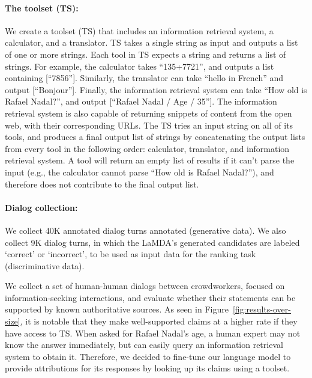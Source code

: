 \paragraph{The toolset (TS):}We create a toolset (TS) that includes an information retrieval system, a calculator, and a translator. TS takes a single string as input and outputs a list of one or more strings. Each tool in TS expects a string and returns a list of strings. For example, the calculator takes ``135+7721'', and outputs a list containing [``7856''].  Similarly, the translator can take ``hello in French'' and output [``Bonjour'']. Finally, the information retrieval system can take ``How old is Rafael Nadal?'', and output [``Rafael Nadal / Age / 35'']. The information retrieval system is also capable of returning snippets of content from the open web, with their corresponding URLs. The TS tries an input string on all of its tools, and produces a final output list of strings by concatenating the output lists from every tool in the following order: calculator, translator, and information retrieval system. A tool will return an empty list of results if it can't parse the input (e.g., the calculator cannot parse ``How old is Rafael Nadal?''), and therefore does not contribute to the final output list.

\paragraph{Dialog collection:}We collect 40K annotated dialog turns annotated (generative data). We also collect 9K dialog turns, in which the LaMDA’s generated candidates are labeled ‘correct’ or ‘incorrect’, to be used as input data for the ranking task (discriminative data).

We collect a set of human-human dialogs between crowdworkers, focused on information-seeking interactions, and evaluate whether their statements can be supported by known authoritative sources. As seen in Figure~\ref{fig:results-over-size}, it is notable that they make well-supported claims at a higher rate if they have access to TS. When asked for Rafael Nadal's age, a human expert may not know the answer immediately, but can easily query an information retrieval system to obtain it. Therefore, we decided to fine-tune our language model to provide attributions for its responses by looking up its claims using a toolset.

